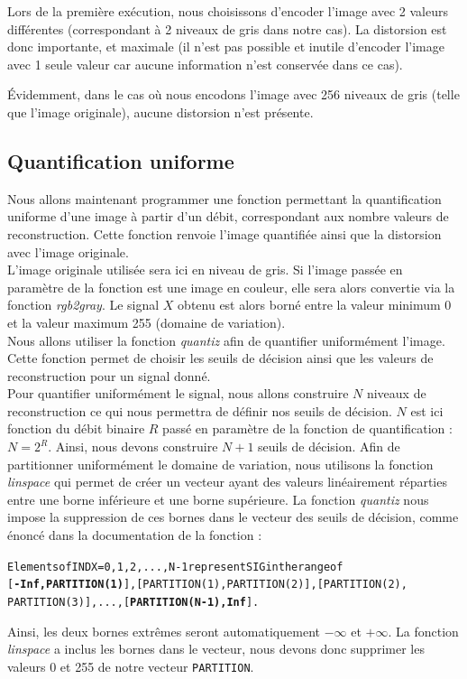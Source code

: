 \documentclass[a4paper, 12pt]{article}
\begin{document}
Lors de la première exécution, nous choisissons d'encoder l'image avec 2 valeurs différentes (correspondant à 2 niveaux de gris dans notre cas). La distorsion est donc importante, et maximale (il n'est pas possible et inutile d'encoder l'image avec 1 seule valeur car aucune information n'est conservée dans ce cas).

Évidemment, dans le cas où nous encodons l'image avec 256 niveaux de gris (telle que l'image originale), aucune distorsion n'est présente.


\subsection{Quantification uniforme}
\label{sec:quantif_uniforme}

Nous allons maintenant programmer une fonction permettant la quantification uniforme d'une image à partir d'un débit, correspondant aux nombre valeurs de reconstruction. Cette fonction renvoie l'image quantifiée ainsi que la distorsion avec l'image originale. \\

L'image originale utilisée sera ici en niveau de gris. Si l'image passée en paramètre de la fonction est une image en couleur, elle sera alors convertie via la fonction \textit{rgb2gray}. Le signal $X$ obtenu est alors borné entre la valeur minimum 0 et la valeur maximum 255 (domaine de variation). \\

Nous allons utiliser la fonction \textit{quantiz} afin de quantifier uniformément l'image. Cette fonction permet de choisir les seuils de décision ainsi que les valeurs de reconstruction pour un signal donné.\\

Pour quantifier uniformément le signal, nous allons construire $N$ niveaux de reconstruction ce qui nous permettra de définir nos seuils de décision. $N$ est ici fonction du débit binaire $R$ passé en paramètre de la fonction de quantification : $N=2^R$. Ainsi, nous devons construire $N+1$ seuils de décision. Afin de partitionner uniformément le domaine de variation, nous utilisons la fonction \textit{linspace} qui permet de créer un vecteur ayant des valeurs linéairement réparties entre une borne inférieure et une borne supérieure. La fonction \textit{quantiz} nous impose la suppression de ces bornes dans le vecteur des seuils de décision, comme énoncé dans la documentation de la fonction : 
\begin{alltt}
 Elements of INDX = 0, 1, 2, ..., N-1 represent SIG in the range of 
[\textbf{-Inf, PARTITION(1)}], [PARTITION(1), PARTITION(2)], [PARTITION(2), 
PARTITION(3)], ..., [\textbf{PARTITION(N-1), Inf}].
\end{alltt}
Ainsi, les deux bornes extrêmes seront automatiquement $-\infty$ et $+\infty$. La fonction \textit{linspace} a inclus les bornes dans le vecteur, nous devons donc supprimer les valeurs 0 et 255 de notre vecteur \verb+PARTITION+. \\
\end{document}
